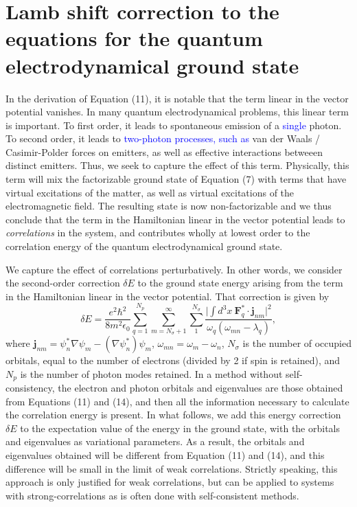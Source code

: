 \documentclass[aps,prb,onecolumn,
	groupedaddress,superscriptaddress,
	amsfonts,amssymb,amsmath,floatfix,
	citeautoscript]{revtex4-1}
\newcommand{\Jadd}[1]{\textcolor{blue}{#1}}
\begin{document}
\section{Lamb shift correction to the equations for the quantum electrodynamical ground state}

In the derivation of Equation (11), it is notable that the term linear in the vector potential vanishes. In many quantum electrodynamical problems, this linear term is important. To first order, it leads to spontaneous emission of a \Jadd{single} photon. To second order, it leads to \Jadd{two-photon processes, such as} van der Waals / Casimir-Polder forces on emitters, as well as effective interactions betweeen distinct emitters. Thus, we seek to capture the effect of this term. Physically, this term will mix the factorizable ground state of Equation (7) with terms that have virtual excitations of the matter, as well as virtual excitations of the electromagnetic field. The resulting state is now non-factorizable and we thus conclude that the term in the Hamiltonian linear in the vector potential leads to \textit{correlations} in the system, and contributes wholly at lowest order to the correlation energy of the quantum electrodynamical ground state.

We capture the effect of correlations perturbatively. In other words, we consider the second-order correction $\delta E$ to the ground state energy arising from the term in the Hamiltonian linear in the vector potential. That correction is given by
\begin{equation}
\delta E = \frac{e^2\hbar^2}{8m^2\epsilon_0}\sum\limits_{q=1}^{N_p}\sum_{m=N_{\sigma}+1}^{\infty}\sum\limits_{1}^{N_{\sigma}} \frac{\Big| \int d^3x~\mathbf{F}_q^*\cdot\mathbf{j}_{nm}\Big|^2}{\omega_q(\omega_{mn} -\lambda_q)},
\end{equation}
where $\mathbf{j}_{nm} = \psi^*_n\nabla\psi_m - (\nabla\psi^*_n)\psi_m$, $\omega_{mn} = \omega_m - \omega_n$, $N_{\sigma}$ is the number of occupied orbitals, equal to the number of electrons (divided by 2 if spin is retained), and $N_p$ is the number of photon modes retained.  In a method without self-consistency, the electron and photon orbitals and eigenvalues are those obtained from Equations (11) and (14), and then all the information necessary to calculate the correlation energy is present. In what follows, we add this energy correction $\delta E$ to the expectation value of the energy in the ground state, with the orbitals and eigenvalues as variational parameters. As a result, the orbitals and eigenvalues obtained will be different from Equation (11) and (14), and this difference will be small in the limit of weak correlations. Strictly speaking, this approach is only justified for weak correlations, but can be applied to systems with strong-correlations as is often done with self-consistent methods. 
\end{document}
